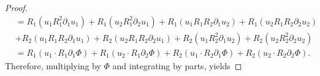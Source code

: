 \documentclass[11pt]{amsart}
\numberwithin{equation}{section}
\begin{document}
\begin{proof}
\begin{align}
			&=R_1( u_1 R_1^2 \partial_1 u_1) + R_1 (u_2 R_1^2 \partial_2 u_1) + R_1 (u_1 R_1 R_2 \partial_1 u_2 )+ R_1 (u_2 R_1 R_2 \partial_2 u_2)\\
			&+R_2 (u_1 R_1 R_2 \partial_1 u_1) + R_2 (u_2 R_1 R_2 \partial_2 u_1) + R_2 (u_1 R_2^2 \partial_1 u_2) + R_2 (u_2 R_2^2 \partial_2 u_2 )\nonumber \\
			&=R_1(u_1\cdot R_1\partial_1\Phi)+R_1(u_2\cdot R_1\partial_2\Phi)+R_2(u_1\cdot R_2\partial_1\Phi)+R_2(u_2\cdot R_2\partial_2\Phi).\nonumber
		\end{align}
	Therefore, multiplying by $\Phi$ and integrating by parts, yields
			
			
			

\end{proof}
\end{document}
